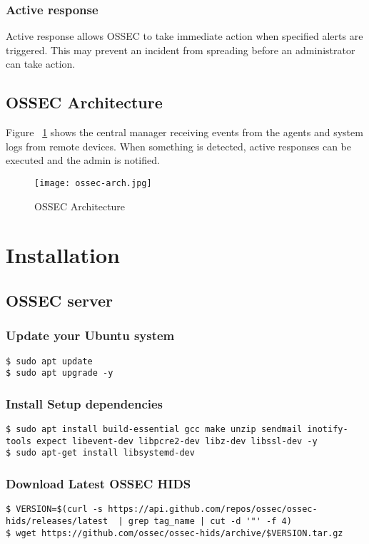 \documentclass{article}
\begin{document}
\subsubsection{Active response}
Active response allows OSSEC to take immediate action when specified alerts are triggered. This may prevent an incident from spreading before an administrator can take action.
\subsection{OSSEC Architecture}
Figure ~\ref{fig: OSSEC Architecture} shows the central manager receiving events from the agents and system logs from remote devices. When something is detected, active responses can be executed and the admin is notified.
\begin{figure}
    \centering
    \texttt{[image: ossec-arch.jpg]}
    \caption{OSSEC Architecture}
    \label{fig: OSSEC Architecture}
\end{figure}
\section {Installation}
\subsection{OSSEC server}
\subsubsection{Update your Ubuntu system}\label{subsubsec:2.1.1}
\begin{verbatim}
$ sudo apt update
$ sudo apt upgrade -y
\end{verbatim}
\subsubsection{Install Setup dependencies}\label{subsubsec:2.1.2}
\begin{verbatim}
$ sudo apt install build-essential gcc make unzip sendmail inotify-tools expect libevent-dev libpcre2-dev libz-dev libssl-dev -y
$ sudo apt-get install libsystemd-dev
\end{verbatim}
\subsubsection{Download Latest OSSEC HIDS}\label{subsubsec:2.1.3}
\begin{verbatim}
$ VERSION=$(curl -s https://api.github.com/repos/ossec/ossec-hids/releases/latest  | grep tag_name | cut -d '"' -f 4)
$ wget https://github.com/ossec/ossec-hids/archive/$VERSION.tar.gz
\end{verbatim}
\end{document}

